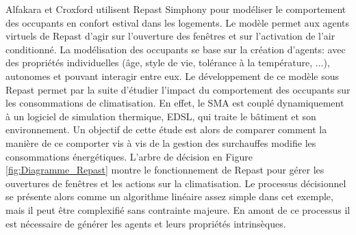 Alfakara et Croxford \cite{Alfakara-14} utilisent Repast Simphony pour modéliser le comportement des occupants en confort estival dans les logements. Le modèle permet aux agents virtuels de Repast d'agir sur l'ouverture des fenêtres et sur l'activation de l'air conditionné. La modélisation des occupants se base sur la création d'agents: avec des propriétés individuelles (âge, style de vie, tolérance à la température, ...), autonomes et pouvant interagir entre eux. Le développement de ce modèle sous Repast permet par la suite d'étudier l'impact du comportement des occupants sur les consommations de climatisation. En effet, le SMA est couplé dynamiquement à un logiciel de simulation thermique, EDSL, qui traite le bâtiment et son environnement. Un objectif de cette étude est alors de comparer comment la manière de ce comporter vis à vis de la gestion des surchauffes modifie les consommations énergétiques. L'arbre de décision en Figure \ref{fig:Diagramme_Repast} montre le fonctionnement de Repast pour gérer les ouvertures de fenêtres et les actions sur la climatisation. Le processus décisionnel se présente alors comme un algorithme linéaire assez simple dans cet exemple, mais il peut être complexifié sans contrainte majeure. En amont de ce processus il est nécessaire de générer les agents et leurs propriétés intrinsèques.

